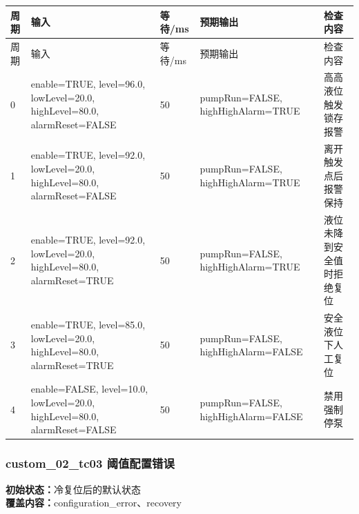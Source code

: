 \begin{longtable}{L{1.0cm}L{4.7cm}L{1.4cm}L{4.0cm}L{2.1cm}}

\toprule

周期 & 输入 & 等待/ms & 预期输出 & 检查内容\\

\midrule

\endfirsthead

\toprule

周期 & 输入 & 等待/ms & 预期输出 & 检查内容\\

\midrule

\endhead

0 & enable=TRUE, level=96.0, lowLevel=20.0, highLevel=80.0, alarmReset=FALSE & 50 & pumpRun=FALSE, highHighAlarm=TRUE & 高高液位触发锁存报警\\

1 & enable=TRUE, level=92.0, lowLevel=20.0, highLevel=80.0, alarmReset=FALSE & 50 & pumpRun=FALSE, highHighAlarm=TRUE & 离开触发点后报警保持\\

2 & enable=TRUE, level=92.0, lowLevel=20.0, highLevel=80.0, alarmReset=TRUE & 50 & pumpRun=FALSE, highHighAlarm=TRUE & 液位未降到安全值时拒绝复位\\

3 & enable=TRUE, level=85.0, lowLevel=20.0, highLevel=80.0, alarmReset=TRUE & 50 & pumpRun=FALSE, highHighAlarm=FALSE & 安全液位下人工复位\\

4 & enable=FALSE, level=10.0, lowLevel=20.0, highLevel=80.0, alarmReset=FALSE & 50 & pumpRun=FALSE, highHighAlarm=FALSE & 禁用强制停泵\\

\bottomrule

\end{longtable}

\subsubsection{{\ttfamily custom\_02\_tc03} 阈值配置错误}

\noindent\textbf{初始状态：}冷复位后的默认状态\\

\textbf{覆盖内容：}configuration\_error、recovery

